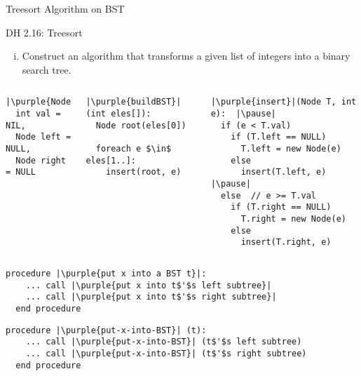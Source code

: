 \begin{frame}{}
  \centerline{\LARGE Treesort Algorithm on BST}

  \vspace{0.30cm}
\end{frame}

\begin{frame}[fragile]{}
  \begin{exampleblock}{DH 2.16: Treesort}
    \begin{enumerate}[(i)]
      \item Construct an algorithm that transforms a given list of integers into a binary search tree.
    \end{enumerate}
  \end{exampleblock}

  \begin{columns}
      \pause
      \begin{lstlisting}[style = Cstyle]
|\purple{Node:}|
  int val = NIL,
  Node left = NULL,
  Node right = NULL
      \end{lstlisting}

      \pause
      \begin{lstlisting}[style = Cstyle]
|\purple{buildBST}|(int eles[]):
  Node root(eles[0])

  foreach e $\in$ eles[1..]:
    insert(root, e)
      \end{lstlisting}
      \pause
      \begin{lstlisting}[style = Cstyle]
|\purple{insert}|(Node T, int e):  |\pause|
  if (e < T.val)
    if (T.left == NULL)
      T.left = new Node(e)
    else
      insert(T.left, e)  |\pause|
  else  // e >= T.val
    if (T.right == NULL)
      T.right = new Node(e)
    else
      insert(T.right, e)
      \end{lstlisting}
  \end{columns}
\end{frame}

\begin{frame}[fragile]{}
  \begin{lstlisting}[style = Cstyle]
  procedure |\purple{put x into a BST t}|:
    ... call |\purple{put x into t$'$s left subtree}|
    ... call |\purple{put x into t$'$s right subtree}|
  end procedure
  \end{lstlisting}

  \pause
  \vspace{0.30cm}
  \centerline{}
  \vspace{0.20cm}
  \begin{lstlisting}[style = Cstyle]
  procedure |\purple{put-x-into-BST}| (t):
    ... call |\purple{put-x-into-BST}| (t$'$s left subtree)
    ... call |\purple{put-x-into-BST}| (t$'$s right subtree)
  end procedure
  \end{lstlisting}
\end{frame}

